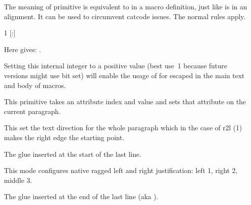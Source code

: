 \stopnewprimitive

\startnewprimitive[title={\prm {parametermark}}]

The meaning of primitive  is equivalent to \type {#} in a
macro definition, just like  is in an alignment. It can be used
to circumvent catcode issues. The normal 
rules apply.

\startbuffer
\def\foo\parametermark1%
  {\def\oof\parametermark{}%
     {[:\parametermark{}]}}
\stopbuffer

\typebuffer \getbuffer

Here \type {\foo{X}\oof{Y}} gives: \foo{X}.

\stopnewprimitive

\startnewprimitive[title={\prm {parametermode}}]

Setting this internal integer to a positive value (best use~1 because future
versions might use bit set) will enable the usage of \type {#} for escaped in the
main text and body of macros.

\stopnewprimitive

\startnewprimitive[title={\prm {parattribute}}]

This primitive takes an attribute index and value and sets that attribute on the
current paragraph.

\stopnewprimitive

\startnewprimitive[title={\prm {pardirection}}]

This set the text direction for the whole paragraph which in the case of \type
{r2l} (1) makes the right edge the starting point.

\stopnewprimitive

\startnewprimitive[title={\prm {parfillleftskip}}]

The glue inserted at the start of the last line.

\stopnewprimitive

\startnewprimitive[title={\prm {parfillmode}}]

This mode configures native ragged left and right justification: left 1, right 2,
middle 3.

\stopnewprimitive

\startnewprimitive[title={\prm {parfillrightskip}}]

The glue inserted at the end of the last line (aka ).

\stopnewprimitive

